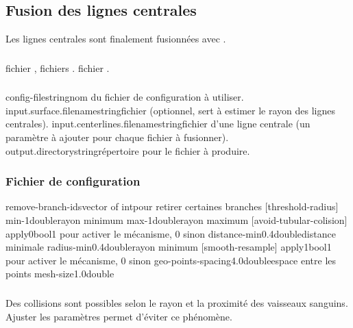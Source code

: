 	\subsection{Fusion des lignes centrales}

Les lignes centrales sont finalement fusionnées avec .

	\subsubsection{\ioT}

\iolist
{fichier \stl, fichiers \vtk.}
{fichier \vtk.}


	\subsubsection{\argsT}

\args
{config-file}{}{string}{nom du fichier de configuration à utiliser.}
{input.surface.filename}{}{string}{fichier \stl (optionnel, sert à estimer le rayon des lignes centrales).}
{input.centerlines.filename}{}{string}{fichier \vtk d'une ligne centrale (un paramètre à ajouter pour chaque fichier à fusionner).}
{output.directory}{}{string}{répertoire pour le fichier \vtk à produire.}
\stoparg


	\subsubsection{Fichier de configuration}

\configfile
{remove-branch-ids}{}{vector of int}{pour retirer certaines branches}
{[threshold-radius]}{}{}{}
{min}{-1}{double}{rayon minimum}
{max}{-1}{double}{rayon maximum}
{[avoid-tubular-colision]}{}{}{}
{apply}{0}{bool}{1 pour activer le mécanisme, 0 sinon}
{distance-min}{0.4}{double}{distance minimale}
{radius-min}{0.4}{double}{rayon minimum}
{[smooth-resample]}{}{}{}
{apply}{1}{bool}{1 pour activer le mécanisme, 0 sinon}
{geo-points-spacing}{4.0}{double}{espace entre les points}
{mesh-size}{1.0}{double}{}
\stopfile

	\subsubsection{\etatg}
	
Des collisions sont possibles selon le rayon et la proximité des vaisseaux sanguins. Ajuster les paramètres  permet d'éviter ce phénomène.

